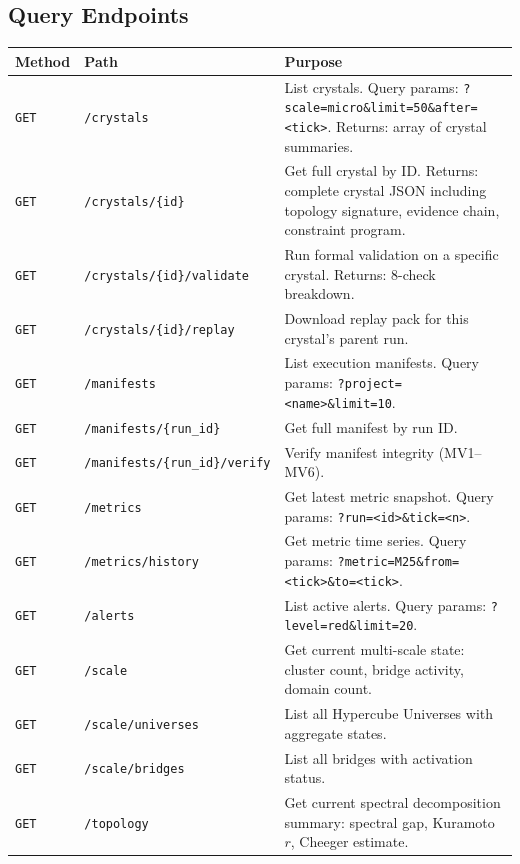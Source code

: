 \documentclass[11pt,a4paper,twoside]{article}
\theoremstyle{definition}
\theoremstyle{plain}
\theoremstyle{remark}
\begin{document}
\subsection{Query Endpoints}

\begin{longtable}{l l p{6.5cm}}
\toprule
\textbf{Method} & \textbf{Path} & \textbf{Purpose} \\
\midrule
\endfirsthead
\midrule
\endhead
\bottomrule
\endfoot
\texttt{GET} & \texttt{/crystals} & List crystals. Query params:
  \texttt{?scale=micro\&limit=50\&after=<tick>}. Returns: array of
  crystal summaries. \\
\texttt{GET} & \texttt{/crystals/\{id\}} & Get full crystal by ID.
  Returns: complete crystal JSON including topology signature,
  evidence chain, constraint program. \\
\texttt{GET} & \texttt{/crystals/\{id\}/validate} & Run formal
  validation on a specific crystal. Returns: 8-check breakdown. \\
\texttt{GET} & \texttt{/crystals/\{id\}/replay} & Download replay pack
  for this crystal's parent run. \\
\texttt{GET} & \texttt{/manifests} & List execution manifests.
  Query params: \texttt{?project=<name>\&limit=10}. \\
\texttt{GET} & \texttt{/manifests/\{run\_id\}} & Get full manifest by
  run ID. \\
\texttt{GET} & \texttt{/manifests/\{run\_id\}/verify} & Verify
  manifest integrity (MV1--MV6). \\
\texttt{GET} & \texttt{/metrics} & Get latest metric snapshot.
  Query params: \texttt{?run=<id>\&tick=<n>}. \\
\texttt{GET} & \texttt{/metrics/history} & Get metric time series.
  Query params: \texttt{?metric=M25\&from=<tick>\&to=<tick>}. \\
\texttt{GET} & \texttt{/alerts} & List active alerts. Query params:
  \texttt{?level=red\&limit=20}. \\
\texttt{GET} & \texttt{/scale} & Get current multi-scale state:
  cluster count, bridge activity, domain count. \\
\texttt{GET} & \texttt{/scale/universes} & List all Hypercube
  Universes with aggregate states. \\
\texttt{GET} & \texttt{/scale/bridges} & List all bridges with
  activation status. \\
\texttt{GET} & \texttt{/topology} & Get current spectral
  decomposition summary: spectral gap, Kuramoto $r$, Cheeger
  estimate. \\
\end{longtable}
\end{document}
